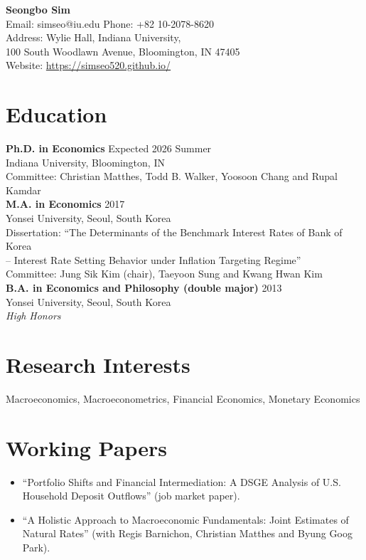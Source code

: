 \documentclass[11pt,a4paper]{article}
\begin{document}
\begin{center}
    {\LARGE \textbf{Seongbo Sim}} \\
    \vspace{2mm}
    Email: simseo@iu.edu \quad Phone: +82 10-2078-8620 \\
    Address: Wylie Hall, Indiana University, \\ 100 South Woodlawn Avenue, Bloomington, IN 47405 \\    
    Website: \url{https://simseo520.github.io/}
\end{center}

\vspace{5mm}

\section*{Education}
\textbf{Ph.D. in Economics} \hfill Expected 2026 Summer \\
Indiana University, Bloomington, IN \\
Committee: Christian Matthes, Todd B. Walker, Yoosoon Chang and Rupal Kamdar \\

\textbf{M.A. in Economics} \hfill 2017 \\
Yonsei University, Seoul, South Korea \\
Dissertation: “The Determinants of the Benchmark Interest Rates of Bank of Korea\\
\phantom{Dissertation:} -- Interest Rate
Setting Behavior under Inflation Targeting Regime” \\
Committee: Jung Sik Kim (chair), Taeyoon Sung and Kwang Hwan Kim\\


\textbf{B.A. in Economics and Philosophy (double major)} \hfill 2013 \\
Yonsei University, Seoul, South Korea \\
\emph{High Honors}\\

\section*{Research Interests}
Macroeconomics, Macroeconometrics, Financial Economics, Monetary Economics

\section*{Working Papers} 
\begin{itemize}[leftmargin=*]
    \item ``Portfolio Shifts and Financial Intermediation: A DSGE Analysis of U.S. Household Deposit Outflows'' (job market paper).
    \item ``A Holistic Approach to Macroeconomic
        Fundamentals: Joint Estimates of
        Natural Rates'' (with Regis Barnichon, Christian Matthes and Byung Goog Park).    
\end{itemize}
\end{document}
